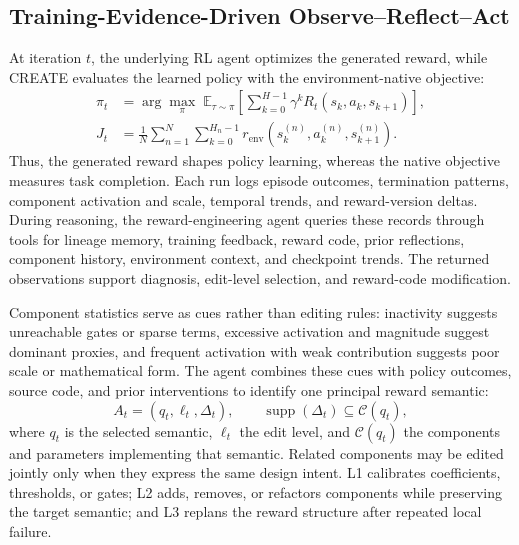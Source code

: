 \subsection{Training-Evidence-Driven Observe--Reflect--Act}
At iteration $t$, the underlying RL agent optimizes the generated reward, while CREATE evaluates the learned policy with the environment-native objective:
\begin{equation}
\begin{aligned}
\pi_t &= \arg\max_{\pi}\;\mathbb E_{\tau\sim\pi}
\left[\sum_{k=0}^{H-1}\gamma^kR_t(s_k,a_k,s_{k+1})\right],\\
J_t &= \frac{1}{N}\sum_{n=1}^{N}\sum_{k=0}^{H_n-1}
 r_{\mathrm{env}}(s_k^{(n)},a_k^{(n)},s_{k+1}^{(n)}).
\end{aligned}
\label{eq:train_eval}
\end{equation}
Thus, the generated reward shapes policy learning, whereas the native objective measures task completion. Each run logs episode outcomes, termination patterns, component activation and scale, temporal trends, and reward-version deltas. During reasoning, the reward-engineering agent queries these records through tools for lineage memory, training feedback, reward code, prior reflections, component history, environment context, and checkpoint trends. The returned observations support diagnosis, edit-level selection, and reward-code modification.

Component statistics serve as cues rather than editing rules: inactivity suggests unreachable gates or sparse terms, excessive activation and magnitude suggest dominant proxies, and frequent activation with weak contribution suggests poor scale or mathematical form. The agent combines these cues with policy outcomes, source code, and prior interventions to identify one principal reward semantic:
\begin{equation}
A_t=(q_t,\ell_t,\Delta_t),
\qquad
\operatorname{supp}(\Delta_t)\subseteq\mathcal C(q_t),
\label{eq:semantic_action}
\end{equation}
where $q_t$ is the selected semantic, $\ell_t$ the edit level, and $\mathcal C(q_t)$ the components and parameters implementing that semantic. Related components may be edited jointly only when they express the same design intent. L1 calibrates coefficients, thresholds, or gates; L2 adds, removes, or refactors components while preserving the target semantic; and L3 replans the reward structure after repeated local failure.

